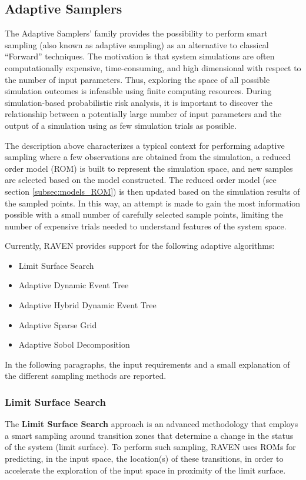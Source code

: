 \subsection{Adaptive Samplers}
\label{subsec:AdaptSamplers}
The Adaptive Samplers' family provides the possibility to perform smart sampling
(also known as adaptive sampling) as an alternative to classical “Forward”
techniques.
%
The motivation is that system simulations are often computationally expensive,
time-consuming, and high dimensional with respect to the number of input
parameters.
%
Thus, exploring the space of all possible simulation outcomes is infeasible
using finite computing resources.
%
During simulation-based probabilistic risk analysis, it is important to discover
the relationship between a potentially large number of input parameters and the
output of a simulation using as few simulation trials as possible.

The description above characterizes a typical context for performing adaptive
sampling where a few observations are obtained from the simulation, a reduced
order model (ROM) is built to represent the simulation space, and new samples
are selected based on the model constructed.
%
The reduced order model (see section \ref{subsec:models_ROM}) is then updated
based on the simulation results of the sampled points.
%
In this way, an attempt is made to gain the most information possible with a
small number of carefully selected sample points, limiting the number of
expensive trials needed to understand features of the system space.
%

Currently, RAVEN provides support for the following adaptive algorithms:

\begin{itemize}
  \item Limit Surface Search
  \item Adaptive Dynamic Event Tree
  \item Adaptive Hybrid Dynamic Event Tree
  \item Adaptive Sparse Grid
  \item Adaptive Sobol Decomposition
\end{itemize}

In the following paragraphs, the input requirements and a small explanation of
the different sampling methods are reported.

\subsubsection{Limit Surface Search}
\label{subsubsubsec:LimitSurfaceSearch}
The \textbf{Limit Surface Search} approach is an advanced methodology that employs
a smart sampling around transition zones that determine a change in the status
of the system (limit surface).
%
To perform such sampling, RAVEN uses ROMs for predicting, in the input space,
the location(s) of these transitions, in order to accelerate the exploration of
the input space in proximity of the limit surface.
%


